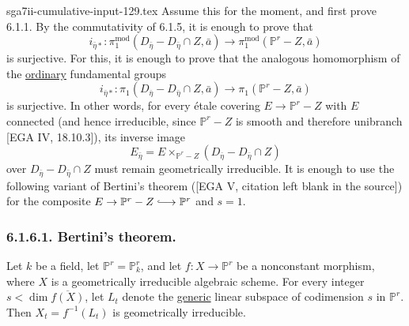 \begin{filecontents*}{sga7ii-cumulative-input-129.tex}
Assume this for the moment, and first prove 6.1.1.  By the commutativity of
6.1.5, it is enough to prove that
\[
i_{\bar\eta*}:
\pi_1^{\mathrm{mod}}(D_{\bar\eta}-D_{\bar\eta}\cap Z,\bar a)
\longrightarrow
\pi_1^{\mathrm{mod}}(\mathbb P^r-Z,\bar a)
\]
is surjective.  For this, it is enough to prove that the analogous
homomorphism of the \underline{ordinary} fundamental groups
\begin{equation}\tag{6.1.6}
i_{\bar\eta*}:
\pi_1(D_{\bar\eta}-D_{\bar\eta}\cap Z,\bar a)
\longrightarrow
\pi_1(\mathbb P^r-Z,\bar a)
\end{equation}
is surjective.  In other words, for every étale covering
$E\to\mathbb P^r-Z$ with $E$ connected (and hence irreducible, since
$\mathbb P^r-Z$ is smooth and therefore unibranch [EGA IV, 18.10.3]), its
inverse image
\[
E_{\bar\eta}
=E\times_{\mathbb P^r-Z}(D_{\bar\eta}-D_{\bar\eta}\cap Z)
\]
over $D_{\bar\eta}-D_{\bar\eta}\cap Z$ must remain geometrically
irreducible.  It is enough to use the following variant of Bertini's theorem
([EGA V, citation left blank in the source]) for the composite
$E\to\mathbb P^r-Z\lhook\joinrel\longrightarrow\mathbb P^r$ and $s=1$.

\subsubsection*{6.1.6.1. Bertini's theorem.}
Let $k$ be a field, let $\mathbb P^r=\mathbb P^r_k$, and let
$f:X\to\mathbb P^r$ be a nonconstant morphism, where $X$ is a geometrically
irreducible algebraic scheme.  For every integer
$s<\dim\overline{f(X)}$, let $L_t$ denote the \underline{generic} linear
subspace of codimension $s$ in $\mathbb P^r$.  Then
$X_t=f^{-1}(L_t)$ is geometrically irreducible.
\end{filecontents*}
